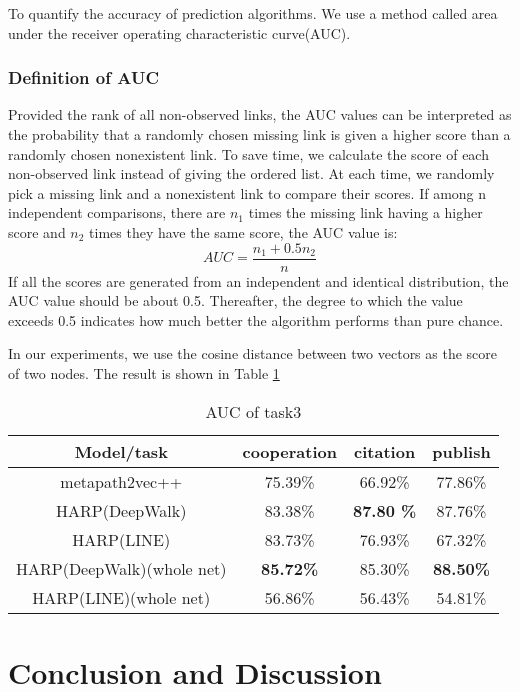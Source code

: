 \documentclass[conference]{IEEEtran}
\begin{document}
To quantify the accuracy of prediction algorithms. We use a method called area under the receiver operating characteristic curve(AUC)\cite{lu2011link}. 
\subsubsection*{Definition of AUC}
Provided the rank of all non-observed links, the AUC values can be interpreted as the probability that a randomly chosen missing link is given a higher score than a randomly chosen nonexistent link. To save time, we calculate the score of each non-observed link instead of giving the ordered list. At each time, we randomly pick a missing link and a nonexistent link to compare their scores. If among n independent comparisons, there are $n_1$ times the missing link having a higher score and $n_2$ times they have the same score, the AUC value is:
\begin{equation}
AUC=\frac{n_1+0.5n_2}{n}
\end{equation}
If all the scores are generated from an independent and identical distribution, the AUC value should be about 0.5. Thereafter, the degree to which the value exceeds 0.5 indicates how much better the algorithm performs than pure chance.

In our experiments, we use the cosine distance between two vectors as the score of two nodes. The result is shown in Table \ref{AUC}
\begin{table}[h]
\center
\begin{tabular}{c|c|c|c}
\hline
\hline
\textbf{Model/task} & \textbf{cooperation} & \textbf{citation} & \textbf{publish}\\
\hline
\hline
metapath2vec++ &75.39\%&66.92\%&77.86\%\\
\hline
HARP(DeepWalk)&83.38\%&\textbf{87.80 \%}&87.76\%\\
\hline
HARP(LINE)&83.73\%&76.93\%& 67.32\%\\
\hline
HARP(DeepWalk)(whole net)& \textbf{85.72\%}&85.30\%&\textbf{88.50\%}\\
\hline
HARP(LINE)(whole net)&56.86\%&56.43\%& 54.81\%\\
\hline
\hline
\end{tabular}
\caption{AUC of task3}
\label{AUC}
\end{table}
\section{Conclusion and Discussion}


\end{document}
